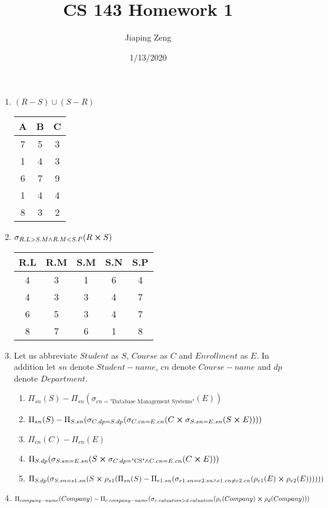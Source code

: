 \documentclass{article}
\title{CS 143 Homework 1}
\date{1/13/2020}
\author{Jiaping Zeng}
\begin{document}
\maketitle

\begin{enumerate}
    \item $(R-S)\cup(S-R)$
          \begin{center}
              \begin{tabular}{|c|c|c|}
                  \hline
                  A & B & C \\
                  \hline
                  7 & 5 & 3 \\
                  1 & 4 & 3 \\
                  6 & 7 & 9 \\
                  1 & 4 & 4 \\
                  8 & 3 & 2 \\
                  \hline
              \end{tabular}
          \end{center}
    \item $\sigma_{R.L>S.M\wedge R.M<S.P}(R\cross S)$
          \begin{center}
              \begin{tabular}{|c|c|c|c|c|}
                  \hline
                  R.L & R.M & S.M & S.N & S.P \\
                  \hline
                  4   & 3   & 1   & 6   & 4   \\
                  4   & 3   & 3   & 4   & 7   \\
                  6   & 5   & 3   & 4   & 7   \\
                  8   & 7   & 6   & 1   & 8   \\
                  \hline
              \end{tabular}
          \end{center}
    \item Let us abbreviate $Student$ as $S$, $Course$ as $C$ and $Enrollment$ as $E$. In addition let $sn$ denote $Student-name$, $cn$ denote $Course-name$ and $dp$ denote $Department$.
          \begin{enumerate}
              \item $\Pi_{sn}(S)-\Pi_{sn}(\sigma_{cn=\text{"Database Management Systems"}}(E))$
              \item $\Pi_{sn}(S)-\Pi_{S.sn}(\sigma_{C.dp=S.dp}(\sigma_{C.cn=E.cn}(C\cross\sigma_{S.sn=E.sn}(S\cross E))))$
              \item $\Pi_{cn}(C)-\Pi_{cn}(E)$
              \item $\Pi_{S.dp}(\sigma_{S.sn=E.sn}(S\cross\sigma_{C.dp=\text{"CS"}\wedge C.cn=E.cn}(C\cross E)))$
              \item $\Pi_{S.dp}(\sigma_{S.sn=s1.sn}(S\cross\rho_{s1}(\Pi_{sn}(S)-\Pi_{e1.sn}(\sigma_{e1.sn=e2.sn\wedge e1.cn\neq c2.cn}(\rho_{e1}(E)\cross\rho_{e2}(E))))))$
          \end{enumerate}
    \item $\Pi_{company-name}(Company)-\Pi_{c.company-name}(\sigma_{c.valuation>d.valuation}(\rho_{c}(Company)\cross\rho_{d}(Company)))$
\end{enumerate}
\end{document}
